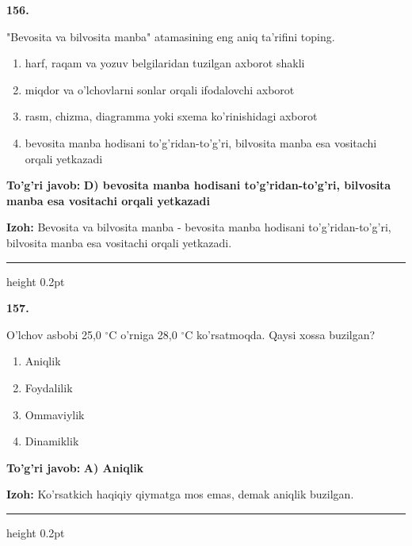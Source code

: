 \documentclass[10pt,a4paper,oneside]{article}
\begin{document}
\noindent\textbf{\color{ink}156.}
\par
"Bevosita va bilvosita manba" atamasining eng aniq ta'rifini toping.
\begin{enumerate}[label=\Alph*),leftmargin=9mm]
\item harf, raqam va yozuv belgilaridan tuzilgan axborot shakli
\item miqdor va o'lchovlarni sonlar orqali ifodalovchi axborot
\item rasm, chizma, diagramma yoki sxema ko'rinishidagi axborot
\item bevosita manba hodisani to'g'ridan-to'g'ri, bilvosita manba esa vositachi orqali yetkazadi
\end{enumerate}
\begin{tcolorbox}[enhanced,breakable,colback=teal!4,colframe=teal!50!black,boxrule=0.5pt,arc=1.1mm,left=3mm,right=3mm,top=1.7mm,bottom=1.7mm,before skip=2mm,after skip=2mm]
\textbf{\color{teal}To'g'ri javob:} \textbf{D) bevosita manba hodisani to'g'ridan-to'g'ri, bilvosita manba esa vositachi orqali yetkazadi}
\par\smallskip
\textbf{Izoh:} Bevosita va bilvosita manba - bevosita manba hodisani to'g'ridan-to'g'ri, bilvosita manba esa vositachi orqali yetkazadi.
\end{tcolorbox}
\vspace{2mm}\hrule height 0.2pt \vspace{3mm}

\noindent\textbf{\color{ink}157.}
\par
O'lchov asbobi 25,0 \ensuremath{^\circ}C o'rniga 28,0 \ensuremath{^\circ}C ko'rsatmoqda. Qaysi xossa buzilgan?
\begin{enumerate}[label=\Alph*),leftmargin=9mm]
\item Aniqlik
\item Foydalilik
\item Ommaviylik
\item Dinamiklik
\end{enumerate}
\begin{tcolorbox}[enhanced,breakable,colback=teal!4,colframe=teal!50!black,boxrule=0.5pt,arc=1.1mm,left=3mm,right=3mm,top=1.7mm,bottom=1.7mm,before skip=2mm,after skip=2mm]
\textbf{\color{teal}To'g'ri javob:} \textbf{A) Aniqlik}
\par\smallskip
\textbf{Izoh:} Ko'rsatkich haqiqiy qiymatga mos emas, demak aniqlik buzilgan.
\end{tcolorbox}
\vspace{2mm}\hrule height 0.2pt \vspace{3mm}
\end{document}
